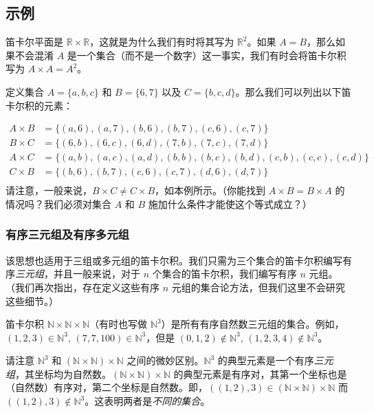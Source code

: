\subsection{示例}

笛卡尔平面是 $\mathbb{R} \times \mathbb{R}$，这就是为什么我们有时将其写为 $\mathbb{R}^2$。如果 $A = B$，那么如果不会混淆 $A$ 是一个集合（而不是一个数字）这一事实，我们有时会将笛卡尔积写为 $A \times A = A^2$。\\

\begin{example}
    定义集合 $A = \{a, b, c\}$ 和 $B = \{6, 7\}$ 以及 $C = \{b, c, d\}$。那么我们可以列出以下笛卡尔积的元素：

    \begin{align*}
        A \times B &= \{(a, 6),(a, 7),(b, 6),(b, 7),(c, 6),(c, 7)\} \\
        B \times C &= \{(6, b),(6, c),(6, d),(7, b),(7, c),(7, d)\} \\
        A \times C &= \{(a, b),(a, c),(a, d),(b, b),(b, c),(b, d),(c, b),(c, c),(c, d)\} \\
        C \times B &= \{(b, 6),(b, 7),(c, 6),(c, 7),(d, 6),(d, 7)\}\\
    \end{align*}
    请注意，一般来说，$B \times C \ne C \times B$，如本例所示。（你能找到 $A \times B = B \times A$ 的情况吗？我们必须对集合 $A$ 和 $B$ 施加什么条件才能使这个等式成立？）
\end{example}

\subsubsection*{有序三元组及有序多元组}

该思想也适用于三组或多元组的笛卡尔积。我们只需为三个集合的笛卡尔积编写有序\emph{三元组}，并且一般来说，对于 $n$ 个集合的笛卡尔积，我们编写有序 $n$ 元组。（我们再次指出，存在定义这些有序 $n$ 元组的集合论方法，但我们这里不会研究这些细节。）\\

\begin{example}
    笛卡尔积 $\mathbb{N} \times \mathbb{N} \times \mathbb{N}$（有时也写做 $\mathbb{N}^3$）是所有有序自然数三元组的集合。例如，$(1, 2, 3) \in \mathbb{N}^3$, $(7, 7, 100) \in \mathbb{N}^3$，但是 $(0, 1, 2) \notin \mathbb{N}^3$, $(1, 2, 3, 4) \notin \mathbb{N}^3$。
\end{example}

请注意 $\mathbb{N}^3$ 和 $(\mathbb{N} \times \mathbb{N}) \times \mathbb{N}$ 之间的微妙区别。$\mathbb{N}^3$ 的典型元素是一个有序\emph{三元组}，其坐标均为自然数。$(\mathbb{N} \times \mathbb{N}) \times \mathbb{N}$ 的典型元素是有序对，其第一个坐标也是（自然数）有序对，第二个坐标是自然数。即，$((1, 2), 3) \in (\mathbb{N} \times \mathbb{N}) \times \mathbb{N}$ 而 $((1, 2), 3) \notin \mathbb{N}^3$。这表明两者是\emph{不同的集合}。

